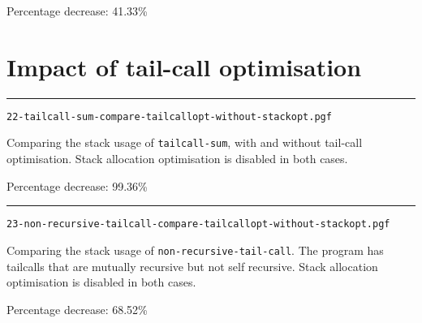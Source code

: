 \documentclass{article}
\newcommand{\plot}[1]{
\rule{\textwidth}{1pt}
\texttt{#1}

\fbox{\resizebox{\textwidth}{!}{}}
}
\begin{document}
Percentage decrease: 41.33\%



\newpage
\section{Impact of tail-call optimisation}

\plot{22-tailcall-sum-compare-tailcallopt-without-stackopt.pgf}

Comparing the stack usage of \texttt{tailcall-sum}, with and without tail-call optimisation. Stack allocation optimisation is disabled in both cases.

Percentage decrease: 99.36\%

\plot{23-non-recursive-tailcall-compare-tailcallopt-without-stackopt.pgf}

Comparing the stack usage of \texttt{non-recursive-tail-call}.
The program has tailcalls that are mutually recursive but not self recursive.
Stack allocation optimisation is disabled in both cases.

Percentage decrease: 68.52\%
\end{document}
